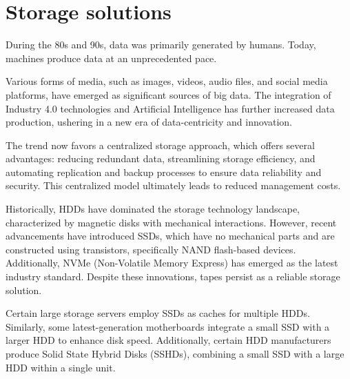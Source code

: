 \section{Storage solutions}

During the 80s and 90s, data was primarily generated by humans. 
Today, machines produce data at an unprecedented pace.

Various forms of media, such as images, videos, audio files, and social media platforms, have emerged as significant sources of big data. 
The integration of Industry 4.0 technologies and Artificial Intelligence has further increased data production, ushering in a new era of data-centricity and innovation.

The trend now favors a centralized storage approach, which offers several advantages: reducing redundant data, streamlining storage efficiency, and automating replication and backup processes to ensure data reliability and security. 
This centralized model ultimately leads to reduced management costs.

Historically, HDDs have dominated the storage technology landscape, characterized by magnetic disks with mechanical interactions. 
However, recent advancements have introduced SSDs, which have no mechanical parts and are constructed using transistors, specifically NAND flash-based devices. 
Additionally, NVMe (Non-Volatile Memory Express) has emerged as the latest industry standard. Despite these innovations, tapes persist as a reliable storage solution.

Certain large storage servers employ SSDs as caches for multiple HDDs. 
Similarly, some latest-generation motherboards integrate a small SSD with a larger HDD to enhance disk speed. 
Additionally, certain HDD manufacturers produce Solid State Hybrid Disks (SSHDs), combining a small SSD with a large HDD within a single unit.

